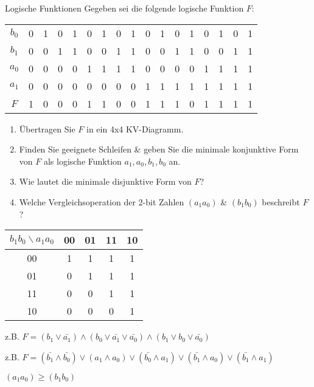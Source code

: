 \documentclass{exercisesheet}
\begin{document}
  \begin{exercise*}{Logische Funktionen}
    Gegeben sei die folgende logische Funktion $F$:
    \begin{center}
      \begin{tabular}{c|cccc cccc cccc cccc}
        $b_0$ & 0 & 1 & 0 & 1 & 0 & 1 & 0 & 1 & 0 & 1 & 0 & 1 & 0 & 1 & 0 & 1\\
        $b_1$ & 0 & 0 & 1 & 1 & 0 & 0 & 1 & 1 & 0 & 0 & 1 & 1 & 0 & 0 & 1 & 1\\
        $a_0$ & 0 & 0 & 0 & 0 & 1 & 1 & 1 & 1 & 0 & 0 & 0 & 0 & 1 & 1 & 1 & 1\\
        $a_1$ & 0 & 0 & 0 & 0 & 0 & 0 & 0 & 0 & 1 & 1 & 1 & 1 & 1 & 1 & 1 & 1\\
        \hline
        $F$ & 1 & 0 & 0 & 0 & 1 & 1 & 0 & 0 & 1 & 1 & 1 & 0 & 1 & 1 & 1 & 1 \\
      \end{tabular}
    \end{center}
    \begin{enumerate}
      \item Übertragen Sie $F$ in ein 4x4 KV-Diagramm.
      \item Finden Sie geeignete Schleifen \& geben Sie die minimale konjunktive Form von $F$ als logische Funktion $a_1, a_0, b_1, b_0$ an.
      \item Wie lautet die minimale disjunktive Form von $F$?
      \item Welche Vergleichsoperation der 2-bit Zahlen $(a_1a_0)$ \& $(b_1b_0)$ beschreibt $F$?
    \end{enumerate}
  \end{exercise*}

  \begin{solution}
    \item
      \begin{tabular}{c|cccc}
        $b_1b_0 \backslash a_1a_0$ & 00 & 01 & 11 & 10\\
        \hline
        00 & 1 & 1 & 1 & 1\\
        01 & 0 & 1 & 1 & 1\\
        11 & 0 & 0 & 1 & 1\\
        10 & 0 & 0 & 0 & 1\\
      \end{tabular}
    \item z.B. $F = (b_1 \lor \bar{a_1}) \land (b_0\lor \bar{a_1}\lor \bar{a_0}) \land (b_1\lor b_0\lor\bar{a_0})$
    \item z.B. $F = (\bar{b_1}\land\bar{b_0}) \lor (a_1\land a_0) \lor (\bar{b_0}\land a_1) \lor (\bar{b_1}\land a_0)\lor(\bar{b_1}\land a_1)$
    \item $(a_1a_0) \geq (b_1b_0)$
  \end{solution}
\end{document}
